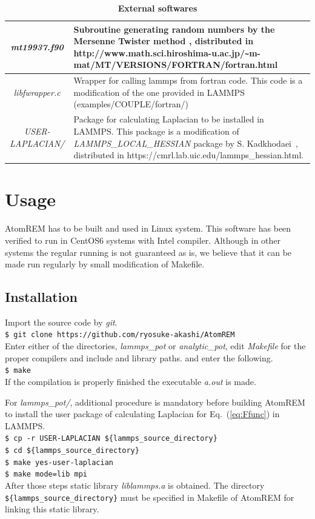 \documentclass[preprint,12pt]{elsarticle}
\newcounter{bla}
\begin{document}
\begin{table}[!t]
\caption{\bf External softwares}
\begin{center}
\begin{tabular}{|c|p{10cm}|}
\hline
  {\it mt19937.f90} & Subroutine generating random numbers by the Mersenne Twister method \cite{MersenneTwister}, distributed in {\rm http://www.math.sci.hiroshima-u.ac.jp/\verb|~|m-mat/MT/VERSIONS/FORTRAN/fortran.html}
\\ \hline
 {\it libfwrapper.c} & Wrapper for calling lammps from fortran code. This code is a modification of the one provided in LAMMPS (examples/COUPLE/fortran/) 
 \\ \hline
 {\it USER-LAPLACIAN/} & Package for calculating Laplacian to be installed in LAMMPS. This package is a modification of {\it LAMMPS\_LOCAL\_HESSIAN} package by S. Kadkhodaei~\cite{localHessian}, 
 distributed in {\rm https://cmrl.lab.uic.edu/lammps\_hessian.html}.\\
\hline
\end{tabular}
\end{center}
\label{table:exter}
\end{table}

\section{Usage}
\label{sec:use}
AtomREM has to be built and used in Linux system. This software has been verified to run in CentOS6 systems with Intel compiler. Although in other systems the regular running is not guaranteed as is, we believe that it can be made run regularly by small modification of Makefile.
\subsection{Installation}
Import the source code by {\it git}.\\
{\tt \$ git clone https://github.com/ryosuke-akashi/AtomREM}\\
Enter either of the directories, {\it lammps\_pot} or {\it analytic\_pot}, edit {\it Makefile} for the proper compilers and include and library paths. and enter the following.\\
{\tt \$ make}\\
If the compilation is properly finished the executable {\it a.out} is made.

For {\it lammps\_pot/}, additional procedure is mandatory before building AtomREM to install the user package of calculating Laplacian for Eq.~(\ref{eq:Ffunc}) in LAMMPS.\\
{\tt \$ cp -r USER-LAPLACIAN {\color{blue}\$\{lammps\_source\_directory\}}}\\
{\tt \$ cd {\color{blue}\$\{lammps\_source\_directory\}}}\\
{\tt \$ make yes-user-laplacian}\\
{\tt \$ make mode=lib mpi}\\
After those steps static library {\it liblammps.a} is obtained. The directory \\ {\tt {\color{blue}\$\{lammps\_source\_directory\}}} must be specified in Makefile of AtomREM for linking this static library.
\end{document}
